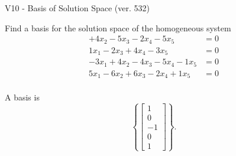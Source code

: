 \begin{exercise}
  \begin{exerciseTitle}V10 - Basis of Solution Space (ver. 532)\end{exerciseTitle}
  \begin{exerciseStatement}
    Find a basis for the solution space of the homogeneous system 
\begin{align*}
 + 4 x_ 2 -5 x_ 3 -2 x_ 4 -5 x_ 5 &= 0  \\ 
  1 x_ 1 -2 x_ 3 + 4 x_ 4 -3 x_ 5 &= 0  \\ 
  -3 x_ 1 + 4 x_ 2 -4 x_ 3 -5 x_ 4 -1 x_ 5 &= 0  \\ 
  5 x_ 1 -6 x_ 2 + 6 x_ 3 -2 x_ 4 + 1 x_ 5 &= 0  \\ 
 \end{align*}


 
  \end{exerciseStatement}

  \begin{exerciseAnswer}
   A basis is   
\[\left\{\left[\begin{array}{c}
1 \\
0 \\
-1 \\
0 \\
1
\end{array}\right]\right\}.\]

  


  \end{exerciseAnswer}
\end{exercise}